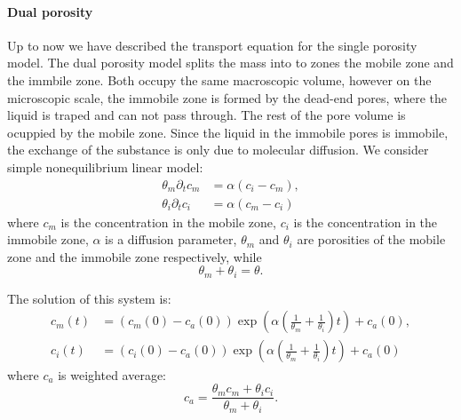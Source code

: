 \paragraph{Dual porosity}
Up to now we have described the transport equation for the single porosity model. The dual porosity model splits the mass into to zones the mobile zone and the immbile zone. 
Both occupy the same macroscopic volume, however on the microscopic scale, the immobile zone is formed by the dead-end pores, where the liquid is traped and can not pass through.
The rest of the pore volume is ocuppied by the mobile zone. Since the liquid in the immobile pores is immobile, the exchange of the substance is only due to molecular diffusion.
We consider simple nonequilibrium linear model:
\begin{align}
    \theta_m \partial_t c_m &= \alpha ( c_i - c_m), \\
    \theta_i \partial_t c_i &= \alpha ( c_m - c_i) 
\end{align}
where $c_m$ is the concentration in the mobile zone, $c_i$ is the concentration in the immobile zone, $\alpha$ is a diffusion parameter, $\theta_m$ and $\theta_i$ are porosities of the mobile zone and the immobile zone respectively, while 
\[
  \theta_m +\theta_i =\theta.
\]

The solution of this system is:
\begin{align}
     c_m(t) &= (c_m(0) - c_a(0)) \exp( \alpha(\frac{1}{\theta_m} + \frac{1}{\theta_i}) t) + c_a(0), \\
     c_i(t) &= (c_i(0) - c_a(0)) \exp( \alpha(\frac{1}{\theta_m} + \frac{1}{\theta_i}) t) + c_a(0)
\end{align}
where $c_a$ is weighted average:
\[
  c_a = \frac{\theta_m c_m + \theta_i c_i}{\theta_m + \theta_i}.
\]








